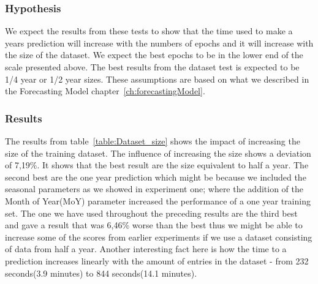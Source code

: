 \subsubsection{Hypothesis}
We expect the results from these tests to show that the time used to make a years prediction will increase with the numbers of epochs and it will increase with the size of the dataset. We expect the best epochs to be in the lower end of the scale presented above. The best results from the dataset test is expected to be 1/4 year or 1/2 year sizes. These assumptions are based on what we described in the Forecasting Model chapter~\ref{ch:forecastingModel}.

\subsubsection{Results}
The results from table~\ref{table:Dataset_size} shows the impact of increasing the size of the training dataset. The influence of increasing the size shows a deviation of 7,19\%. It shows that the best result are the size equivalent to half a year. The second best are the one year prediction which might be because we included the seasonal parameters as we showed in experiment one; where the addition of the Month of Year(MoY) parameter increased the performance of a one year training set. The one we have used throughout the preceding results are the third best and gave a result that was 6,46\% worse than the best thus we might be able to increase some of the scores from earlier experiments if we use a dataset consisting of data from half a year. Another interesting fact here is how the time to a prediction increases linearly with the amount of entries in the dataset - from 232 seconds(3.9 minutes) to 844 seconds(14.1 minutes).

\begin{table}[H]
\centering  %
\caption{The results from the dataset size test.} %
\label{table:Dataset_size} %
\end{table}


